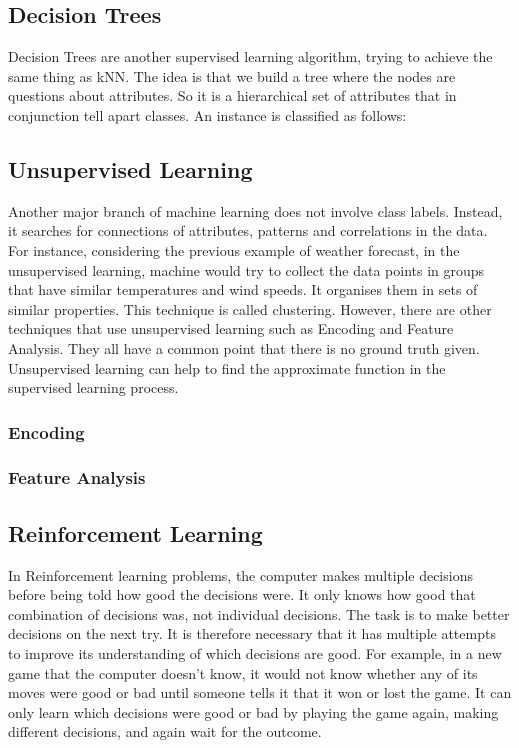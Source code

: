 \documentclass[10pt,a4paper]{article}
\begin{document}
\subsection{Decision Trees}
Decision Trees are another supervised learning algorithm, trying to achieve the same thing as kNN. The idea is that we build a tree where the nodes are questions about attributes. So it is a hierarchical set of attributes that in conjunction tell apart classes. An instance is classified as follows:
\subsection{Unsupervised Learning}
Another major branch of machine learning does not involve class labels. Instead, it searches for connections of attributes, patterns and correlations in the data. For instance, considering the previous example of weather forecast, in the unsupervised learning, machine would try to collect the data points in groups that have similar temperatures and wind speeds. It organises them in sets of similar properties. This technique is called clustering. However, there are other techniques that use unsupervised learning such as Encoding and Feature Analysis.
They all have a common point that there is no ground truth given. Unsupervised learning can help to find the approximate function in the supervised learning process.

\subsubsection{Encoding}
\subsubsection{Feature Analysis}
\subsection{Reinforcement Learning}
In Reinforcement learning problems, the computer makes multiple decisions before being told how good the decisions were. It only knows how good that combination of decisions was, not individual decisions. The task is to make better decisions on the next try. It is therefore necessary that it has multiple attempts to improve its understanding of which decisions are good. For example, in a new game that the computer doesn't know, it would not know whether any of its moves were good or bad until someone tells it that it won or lost the game. It can only learn which decisions were good or bad by playing the game again, making different decisions, and again wait for the outcome.
\end{document}
